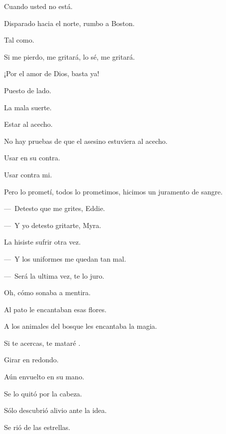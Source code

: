 \sk
Cuando usted no está. 

\sk
Disparado hacia el norte, rumbo a Boston. 

\sk
Tal como. 

\sk
Si me pierdo, me gritará, lo sé, me gritará. 

\sk
¡Por el amor de Dios, basta ya!\nb{}

\sk
Puesto de lado. 

\sk
La mala suerte. 

\sk
Estar al acecho. 

\sk
No hay pruebas de que el asesino estuviera al acecho. 

\sk
Usar en su contra. 

\sk
Usar contra mi. \nb{}

\sk
Pero lo prometí, todos lo prometimos, hicimos un juramento de sangre. 

\sk
---~Detesto que me grites, Eddie.\nb{}

---~Y yo detesto gritarte, Myra.\nb{}

\sk
La hisiste sufrir otra vez. 

\sk
---~Y los uniformes me quedan tan mal.\nb{}

---~Será la ultima vez, te lo juro.\nb{}

\sk
Oh, cómo sonaba a mentira. 

\sk
Al pato le encantaban esas flores.\nb{}

\sk
A los animales del bosque les encantaba la magia.\nb{}

\sk
Si te acercas, te mataré .\nb{}

\sk
Girar en redondo. 

\sk
Aún envuelto en su mano. 

\sk
Se lo quitó por la cabeza. 

\sk
Sólo descubrió alivio ante la idea. 

\sk
Se rió de las estrellas. 

